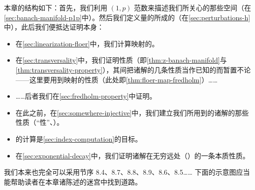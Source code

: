 本章的结构如下：首先，我们利用\trSobolev{} $(1,p)$ 范数来描述我们所关心的那些\trTrajectory{}空间（在\cref{sec:banach-manifold-p1p}中）。然后我们定义\trHamiltonian{}量的\trPerturbation{}所成的\trBanachSpace（在\cref{sec:perturbations-h}中），此后我们便抵达证明本身：

\begin{itemize}
\item 在\cref{sec:linearization-floer}中，我们计算\trFloer{}映射的\trDifferential。
\item 在\cref{sec:transversality}中，我们证明\trTransversality{}性质（即\cref{thm:z-banach-manifold}与\cref{thm:transversality-property}），其间把\trFloerEquation{}诸解的几条性质当作已知的而暂置不论——这里要用到\trFloer{}映射的\trFredholm{}性质（此处即\cref{thm:floer-map-fredholm}）……
\item ……后者我们在\cref{sec:fredholm-property}中证明。
\item 在此之前，在\cref{sec:somewhere-injective}中，我们建立我们所用到的\trFloerEquation{}诸解的那些性质（“\trInjective{}性”、\trContinuationPrinciple）。
\item \trIndex{}的计算是\cref{sec:index-computation}的目标。
\item 在\cref{sec:exponential-decay}中，我们证明\trFloerEquation{}诸解在无穷远处（\trExponentialDecay）的一条本质性质。
\end{itemize}

我们本来也完全可以采用节序 8.4、8.7、8.8、8.9、8.6、8.5……
下面的示意图应当能帮助读者在本章诸陈述的迷宫中找到道路。

\begin{center}
\end{center}
